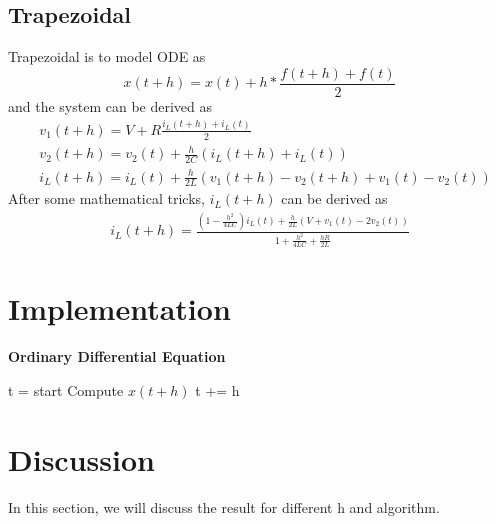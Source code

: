 \documentclass{article}
\begin{document}
\subsection{Trapezoidal}
Trapezoidal is to model ODE as 
$$
    x(t + h) = x(t) + h * \frac{f(t+h) + f(t)}{2}
$$
and the system can be derived as
\begin{align}
    & v_1(t+h) = V + R\frac{i_L(t+h) + i_L(t)}{2} \\
    & v_2(t+h) = v_2(t) + \frac{h}{2C}(i_L(t+h) + i_L(t)) \\
    & i_L(t+h) = i_L(t) + \frac{h}{2L}(v_1(t+h) - v_2(t+h) + v_1(t) - v_2(t))
\end{align}
After some mathematical tricks, $i_L(t+h)$ can be derived as
\begin{align}
    i_L(t+h) = \frac{(1-\frac{h^2}{4LC})i_L(t) + \frac{h}{2L}(V + v_1(t) - 2v_2(t))}{1 + \frac{h^2}{4LC} + \frac{hR}{2L}}
\end{align}

\section{Implementation}
\begin{algorithm}[H]
    \caption{\textbf{Ordinary Differential Equation}}
    \begin{algorithmic}
        \State t = start
            \State Compute $x(t+h)$
            \State t += h
        \EndWhile
    \end{algorithmic}
\end{algorithm}

\section{Discussion}
In this section, we will discuss the result for different h and algorithm.
\end{document}
